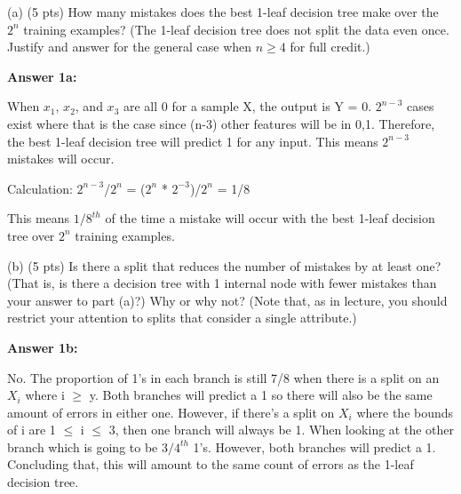 \documentclass[10pt]{article}
\begin{document}
(a) (5 pts) How many mistakes does the best 1-leaf decision tree make over the $2^{n}$ training examples? (The 1-leaf decision tree does not split the data even once. Justify and answer for the general case when $n \geq 4$ for full credit.)

\hspace{1 cm}

\begin{flushleft}

\textbf{Answer 1a:}

\hspace{1 cm}
When $x_1$, $x_2$, and $x_3$ are all 0 for a sample X, the output is Y = 0. $2^{n-3}$ cases exist where that is the case since (n-3) other features will be in {0,1}. Therefore, the best 1-leaf decision tree will predict 1 for any input. This means $2^{n-3}$ mistakes will occur. 

\hspace{1 cm}

Calculation:
$2^{n-3}$/$2^{n}$ = ($2^n$ * $2^{-3}$)/$2^n$ =  1/8

This means $1/8^{th}$ of the time a mistake will occur with the best 1-leaf decision tree over $2^{n}$ training examples.

\hspace{1 cm}

\end{flushleft}

(b) (5 pts) Is there a split that reduces the number of mistakes by at least one? (That is, is there a decision tree with 1 internal node with fewer mistakes than your answer to part (a)?) Why or why not? (Note that, as in lecture, you should restrict your attention to splits that consider a single attribute.)

\hspace{1 cm}

\begin{flushleft}
    

\textbf{Answer 1b:}

\hspace{1 cm}

No. The proportion of 1's in each branch is still 7/8 when there is a split on an $X_i$ where i $\ge$ y. Both branches will predict a 1 so there will also be the same amount of errors in either one. However, if there's a split on $X_i$ where the bounds of i are 1 $\leq$ i $\leq$ 3, then one branch will always be 1. When looking at the other branch which is going to be $3/4^{th}$ 1's. However, both branches will predict a 1. Concluding that, this will amount to the same count of errors as the 1-leaf decision tree.

\hspace{1 cm}

\end{flushleft}
\end{document}
